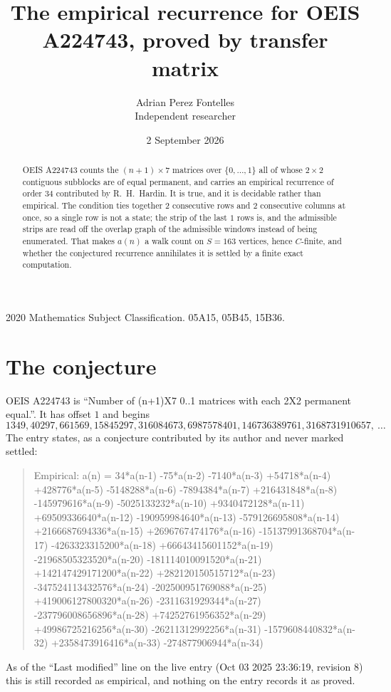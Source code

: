 \documentclass[11pt,a4paper]{article}
\title{The empirical recurrence for OEIS A224743, proved by transfer matrix}
\author{Adrian Perez Fontelles\\ \small Independent researcher}
\date{2 September 2026}
\theoremstyle{plain}
\theoremstyle{definition}
\begin{document}
\maketitle

\begin{abstract}
OEIS A224743 counts the $(n+1)\times7$ matrices over $\{0,\dots,1\}$ all of whose
$2\times2$ contiguous subblocks are of equal permanent, and carries an empirical recurrence of order
$34$ contributed by R.~H.~Hardin. It is true, and it is decidable rather than empirical.
The condition ties together $2$ consecutive rows and $2$ consecutive columns at once, so a
single row is not a state; the strip of the last $1$ rows is, and the admissible strips
are read off the overlap graph of the admissible windows instead of being enumerated. That
makes $a(n)$ a walk count on $S=163$ vertices, hence $C$-finite, and whether the conjectured
recurrence annihilates it is settled by a finite exact computation.
\end{abstract}

\noindent\small 2020 Mathematics Subject Classification. 05A15, 05B45, 15B36.\normalsize

\section{The conjecture}

OEIS A224743 is ``Number of (n+1)X7 0..1 matrices with each 2X2 permanent equal.''. It has offset $1$ and begins
\[
1349, 40297, 661569, 15845297, 316084673, 6987578401, 146736389761, 3168731910657,\ \dots
\]
The entry states, as a conjecture contributed by its author and never marked settled:
\begin{quote}
Empirical: a(n) = 34*a(n-1) -75*a(n-2) -7140*a(n-3) +54718*a(n-4) +428776*a(n-5) -5148288*a(n-6) -7894384*a(n-7) +216431848*a(n-8) -145979616*a(n-9) -5025133232*a(n-10) +9340472128*a(n-11) +69509336640*a(n-12) -190959984640*a(n-13) -579126695808*a(n-14) +2166687694336*a(n-15) +2696767474176*a(n-16) -15137991368704*a(n-17) -4263323315200*a(n-18) +66643415601152*a(n-19) -21968505323520*a(n-20) -181114010091520*a(n-21) +142147429171200*a(n-22) +282120150515712*a(n-23) -347524113432576*a(n-24) -202500951769088*a(n-25) +419006127800320*a(n-26) -2311631929344*a(n-27) -237796008656896*a(n-28) +74252761956352*a(n-29) +49986725216256*a(n-30) -26211312992256*a(n-31) -1579608440832*a(n-32) +2358473916416*a(n-33) -274877906944*a(n-34)
\end{quote}
As of the ``Last modified'' line on the live entry (Oct 03 2025 23:36:19, revision 8) this is still
recorded as empirical, and nothing on the entry records it as proved.
\end{document}
